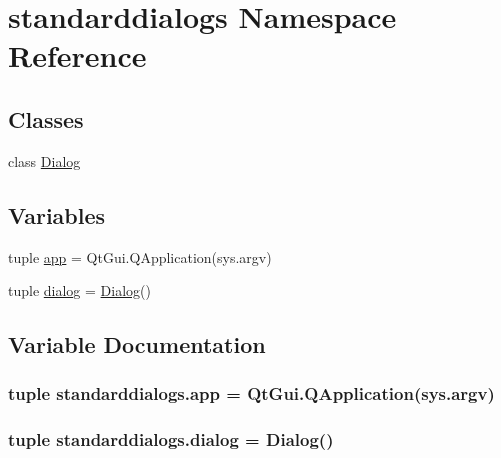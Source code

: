 \hypertarget{namespacestandarddialogs}{}\section{standarddialogs Namespace Reference}
\label{namespacestandarddialogs}
\subsection*{Classes}
\begin{DoxyCompactItemize}
\item 
class \hyperlink{classstandarddialogs_1_1Dialog}{Dialog}
\end{DoxyCompactItemize}
\subsection*{Variables}
\begin{DoxyCompactItemize}
\item 
tuple \hyperlink{namespacestandarddialogs_a9f7f228c8077b5b2f2da80d5c084fa62}{app} = Qt\+Gui.\+Q\+Application(sys.\+argv)
\item 
tuple \hyperlink{namespacestandarddialogs_af6e92e275fed4cfb17f60a6d5ba0f9d0}{dialog} = \hyperlink{classstandarddialogs_1_1Dialog}{Dialog}()
\end{DoxyCompactItemize}


\subsection{Variable Documentation}
\hypertarget{namespacestandarddialogs_a9f7f228c8077b5b2f2da80d5c084fa62}{}
\subsubsection[{app}]{\setlength{\rightskip}{0pt plus 5cm}tuple standarddialogs.\+app = Qt\+Gui.\+Q\+Application(sys.\+argv)}\label{namespacestandarddialogs_a9f7f228c8077b5b2f2da80d5c084fa62}
\hypertarget{namespacestandarddialogs_af6e92e275fed4cfb17f60a6d5ba0f9d0}{}
\subsubsection[{dialog}]{\setlength{\rightskip}{0pt plus 5cm}tuple standarddialogs.\+dialog = {\bf Dialog}()}\label{namespacestandarddialogs_af6e92e275fed4cfb17f60a6d5ba0f9d0}

